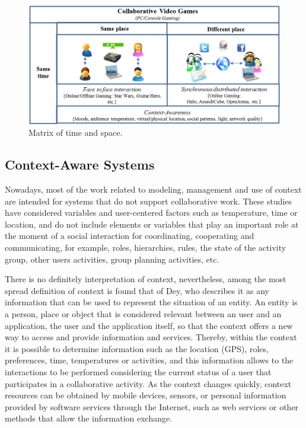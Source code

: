 \documentclass{./sty/llncs}
\begin{document}
\begin{figure}[ht!]
	\centering
	\includegraphics[width=12cm]{images/matrix.png}
	\caption{Matrix of time and space.} %
	\label{fig:matrix}
\end{figure}

\subsection{Context-Aware Systems}
Nowadays, most of the work related to modeling, management and use of context are intended for systems that do not support collaborative work. These studies have considered variables and user-centered factors such as temperature, time or location, and do not include elements or variables that play an important role at the moment of a social interaction for coordinating, cooperating and communicating, for example, roles, hierarchies, rules, the state of the activity group, other users activities, group planning activities, etc.

There is no definitely interpretation of context, nevertheless, among the most spread definition of context is found that of Dey\cite{Dey01}, who describes it as any information that can be used to represent the situation of an entity. An entity is a person, place or object that is considered relevant between an user and an application, the user and the application itself, so that the context offers a new way to access and provide information and services. Thereby, within the context it is possible to determine information such as the location (GPS), roles, preferences, time, temperatures or activities, and this information allows to the interactions to be performed considering the current status of a user that participates in a collaborative activity. As the context changes quickly, context resources can be obtained by mobile devices, sensors, or personal information provided by software services through the Internet, such as web services or other methods that allow the information exchange.
\end{document}
